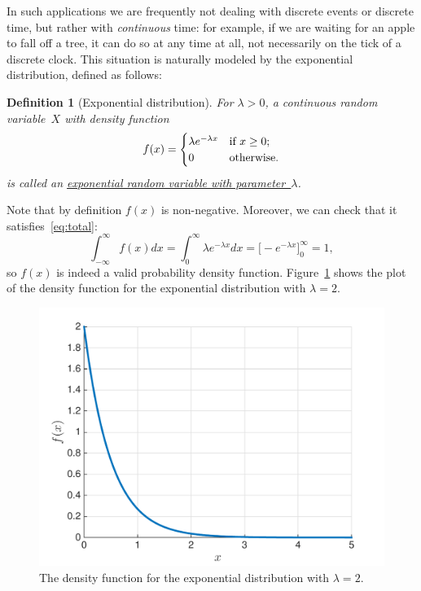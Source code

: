 \documentclass[11pt]{article}
\def\ul#1{\underline{#1}}
\newcounter{thm}
\newtheorem{definition}{Definition}[thm]
\begin{document}
In such applications we are frequently not dealing with discrete events or discrete
time, but rather with {\it continuous\/} time: for example, if we are waiting for an apple to fall
off a tree, it can do so at any time at all, not necessarily on the tick of a discrete clock.
This situation is naturally modeled by the exponential distribution, defined as follows:
\begin{definition}[Exponential distribution]
For $\lambda>0$, a continuous random variable~$X$ with density function
$$
   f(x) = \begin{cases}
        \lambda e^{-\lambda x} & \hbox{\rm if $x\ge 0$};\\
        0 & \hbox{\rm otherwise}.
   \end{cases} $$
is called an \ul{exponential random variable with parameter~$\lambda$}.
\end{definition}

Note that by definition $f(x)$ is non-negative. Moreover, we can check that it satisfies~\eqref{eq:total}:
$$ \int_{-\infty}^\infty f(x)dx =
           \int_0^\infty \lambda e^{-\lambda x}dx = \bigl[-e^{-\lambda x}\bigr]_0^\infty = 1, $$
so $f(x)$ is indeed a valid probability density function. Figure~\ref{fig:exponential} shows the
plot of the density function for the exponential distribution with $\lambda = 2$.

\begin{figure}[h!]
\centering
\includegraphics[scale=0.35]{exponential}
\caption{The density function for the exponential distribution with $\lambda = 2$.}
\label{fig:exponential}
\end{figure}
\end{document}
